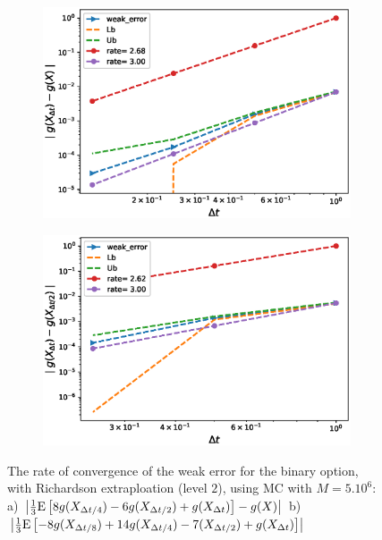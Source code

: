 \documentclass[11pt]{article}
\newcommand{\expt}[1]{\mathrm{E}\left[#1\right]}
\begin{document}
\begin{figure}[h!]
	\centering
	\begin{subfigure}{.4\textwidth}
		\centering
		\includegraphics[width=1\linewidth]{./figures/binary_weak_error/with_richardson/weak_convergence_order_binary_richardson_level2_relative_M_5_10_6}
		\caption{}
		\label{fig:sub3}
	\end{subfigure}%
	\begin{subfigure}{.4\textwidth}
		\centering
		\includegraphics[width=1\linewidth]{./figures/binary_weak_error/with_richardson/weak_convergence_order_differences_binary_richardson_level2_relative_M_5_10_6}
		\caption{}
		\label{fig:sub4}
	\end{subfigure}
	
	\caption{The rate of convergence of the weak error for the binary option, with Richardson extraploation (level $2$), using MC with $M=5.10^6$: a) $\abs{\frac{1}{3}\expt{8 g(X_{\Delta t/4}) -6g(X_{\Delta t/2}) +g(X_{\Delta t})}-g(X)}$  b) $\abs{\frac{1}{3}\expt{-8 g(X_{\Delta t/8}) +14g(X_{\Delta t/4})-7 (X_{\Delta t/2}) +g(X_{\Delta t})}}$ }
	\label{fig:fig:Weak_rate_binary_with_rich_level2}
\end{figure}
\end{document}
